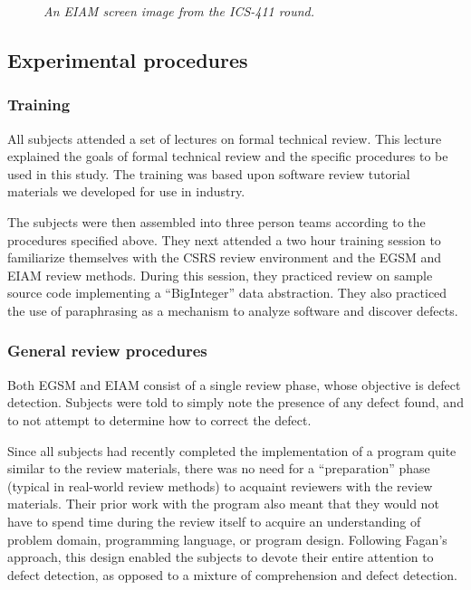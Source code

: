 \begin{figure}[htb]
 {\centerline{}}
 \caption{{\em An EIAM screen image from the ICS-411 round.}}
 \label{fig:eiam-screen}
\end{figure}


\subsection{Experimental procedures}

\subsubsection{Training}

All subjects attended a set of lectures on formal technical review. This
lecture explained the goals of formal technical review and the specific
procedures to be used in this study.  The training was based upon software
review tutorial materials we developed for use in industry.

The subjects were then assembled into three person teams according to the
procedures specified above. They next attended a two hour training session
to familiarize themselves with the CSRS review environment and the EGSM and
EIAM review methods. During this session, they practiced review on sample
source code implementing a ``BigInteger'' data abstraction. They also
practiced the use of paraphrasing as a mechanism to analyze software and
discover defects.

\subsubsection{General review procedures}

Both EGSM and EIAM consist of a single review phase, whose objective is
defect detection.  Subjects were told to simply note the presence of any
defect found, and to not attempt to determine how to correct the defect.


Since all subjects had recently completed the implementation of a program
quite similar to the review materials, there was no need for a
``preparation'' phase (typical in real-world review methods) to acquaint
reviewers with the review materials. Their prior work with the
program also meant that they would not have to spend time during the review
itself to acquire an understanding of problem domain, programming language,
or program design. Following Fagan's approach, this design enabled the
subjects to devote their entire attention to defect detection, as opposed
to a mixture of comprehension and defect detection.

